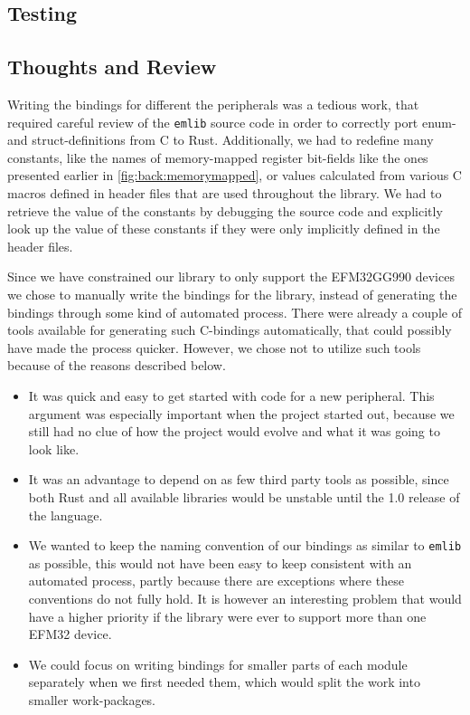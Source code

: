 \subsection{Testing}
\label{ssub:testing}


\subsection{Thoughts and Review}


Writing the bindings for different the peripherals was a tedious work, that required careful review of the \texttt{emlib} source code in order to correctly port enum- and struct-definitions from C to Rust.
Additionally, we had to redefine many constants, like the names of memory-mapped register bit-fields like the ones presented earlier in \autoref{fig:back:memorymapped}, or values calculated from various C macros defined in header files that are used throughout the library.
We had to retrieve the value of the constants by debugging the source code and explicitly look up the value of these constants if they were only implicitly defined in the header files.

Since we have constrained our library to only support the EFM32GG990 devices we chose to manually write the bindings for the library, instead of generating the bindings through some kind of automated process.
There were already a couple of tools available for generating such C-bindings automatically, that could possibly have made the process quicker.
However, we chose not to utilize such tools because of the reasons described below.

\begin{itemize}
    \item It was quick and easy to get started with code for a new peripheral.
    This argument was especially important when the project started out, because we still had no clue of how the project would evolve and what it was going to look like.

    \item It was an advantage to depend on as few third party tools as possible, since both Rust and all available libraries would be unstable until the 1.0 release of the language.

    \item We wanted to keep the naming convention of our bindings as similar to \texttt{emlib} as possible, this would not have been easy to keep consistent with an automated process, partly because there are exceptions where these conventions do not fully hold.
    It is however an interesting problem that would have a higher priority if the library were ever to support more than one EFM32 device.

    \item We could focus on writing bindings for smaller parts of each module separately when we first needed them, which would split the work into smaller work-packages.
\end{itemize}
